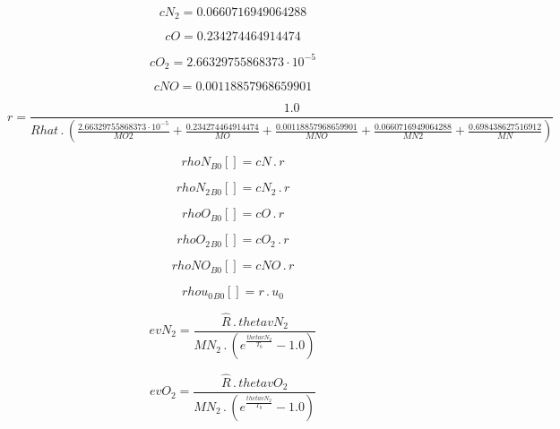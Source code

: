 \documentclass{article}
\begin{document}
\begin{dmath}cN_{2} = 0.0660716949064288\end{dmath}

\begin{dmath}cO = 0.234274464914474\end{dmath}

\begin{dmath}cO_{2} = 2.66329755868373 \cdot 10^{-5}\end{dmath}

\begin{dmath}cNO = 0.00118857968659901\end{dmath}

\begin{dmath}r = \frac{1.0}{Rhat \,.\, \left(\frac{2.66329755868373 \cdot 10^{-5}}{MO2} + \frac{0.234274464914474}{MO} + \frac{0.00118857968659901}{MNO} + \frac{0.0660716949064288}{MN2} + \frac{0.698438627516912}{MN}\right)}\end{dmath}

\begin{dmath}{rhoN{_{B0}}}[{}] = cN \,.\, r\end{dmath}

\begin{dmath}{rhoN_{2}{_{B0}}}[{}] = cN_{2} \,.\, r\end{dmath}

\begin{dmath}{rhoO{_{B0}}}[{}] = cO \,.\, r\end{dmath}

\begin{dmath}{rhoO_{2}{_{B0}}}[{}] = cO_{2} \,.\, r\end{dmath}

\begin{dmath}{rhoNO{_{B0}}}[{}] = cNO \,.\, r\end{dmath}

\begin{dmath}{rhou_{0}{_{B0}}}[{}] = r \,.\, u_{0}\end{dmath}

\begin{dmath}evN_{2} = \frac{\hat{R} \,.\, thetavN_{2}}{MN_{2} \,.\, \left(e^{\frac{thetavN_{2}}{T_{0}}} - 1.0\right)}\end{dmath}

\begin{dmath}evO_{2} = \frac{\hat{R} \,.\, thetavO_{2}}{MN_{2} \,.\, \left(e^{\frac{thetavN_{2}}{T_{0}}} - 1.0\right)}\end{dmath}
\end{document}
